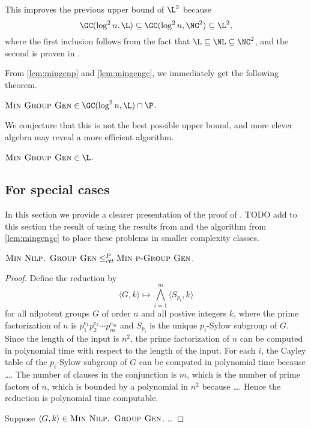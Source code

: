 \documentclass{article}
\begin{document}
This improves the previous upper bound of $\L^2$ because
\begin{equation*}
  \GC(\log^2 n, \L) \subseteq \GC(\log^2 n, \NC^2) \subseteq \L^2,
\end{equation*}
where the first inclusion follows from the fact that $\L \subseteq \NL \subseteq \NC^2$, and the second is proven in \cite[Lemma~3.2.8]{wolf90}.

From \autoref{lem:mingenp} and \autoref{lem:mingengc}, we immediately get the following theorem.

\begin{theorem}
  $\textsc{Min Group Gen} \in \GC(\log^2 n, \L) \cap \P$.
\end{theorem}

We conjecture that this is not the best possible upper bound, and more clever algebra may reveal a more efficient algorithm.

\begin{conjecture}
  $\textsc{Min Group Gen} \in \L$.
\end{conjecture}

\subsection{For special cases}

In this section we provide a clearer presentation of the proof of \cite[Theorem~7]{at06}.
TODO add to this section the result of using the results from \cite{bklm01} and the algorithm from \autoref{lem:mingengc} to place these problems in smaller complexity classes.

\begin{proposition}
  $\textsc{Min Nilp. Group Gen} \leq_{ctt}^P \textsc{Min p-Group Gen}$.
\end{proposition}
\begin{proof}
  Define the reduction by
  \begin{equation*}
    \langle G, k \rangle \mapsto \bigwedge_{i=1}^m \langle S_{p_i}, k \rangle
  \end{equation*}
  for all nilpotent groups $G$ of order $n$ and all postive integers $k$, where the prime factorization of $n$ is $p_1^{e_1}p_2^{e_2}\dotsb p_m^{e_m}$ and $S_{p_i}$ is the unique $p_i$-Sylow subgroup of $G$.
  Since the length of the input is $n^2$, the prime factorization of $n$ can be computed in polynomial time with respect to the length of the input.
  For each $i$, the Cayley table of the $p_i$-Sylow subgroup of $G$ can be computed in polynomial time because \ldots.
  The number of clauses in the conjunction is $m$, which is the number of prime factors of $n$, which is bounded by a polynomial in $n^2$ because \ldots.
  Hence the reduction is polynomial time computable.

  Suppose $\langle G, k \rangle \in \textsc{Min Nilp. Group Gen}$.
  \ldots
\end{proof}
\end{document}
